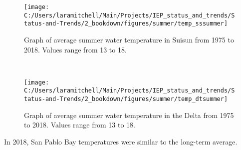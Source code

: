 \documentclass[
]{book}
\begin{document}
\begin{panel-grid}
\begin{columns-nocenter}
\begin{column40}
\end{column40}

\begin{column800}

\begin{expand}

\begin{figure}
\texttt{[image: C:/Users/laramitchell/Main/Projects/IEP\_status\_and\_trends/Status-and-Trends/2\_bookdown/figures/summer/temp\_sssummer]} \caption{Graph of average summer water temperature in Suisun from 1975 to 2018. Values range from 13 to 18.}\label{fig:unnamed-chunk-58}
\end{figure}

\end{expand}

\end{column800}

\begin{column40}

~

\end{column40}

\begin{column800}

\begin{expand}

\begin{figure}
\texttt{[image: C:/Users/laramitchell/Main/Projects/IEP\_status\_and\_trends/Status-and-Trends/2\_bookdown/figures/summer/temp\_dtsummer]} \caption{Graph of average summer water temperature in the Delta from 1975 to 2018. Values range from 13 to 18.}\label{fig:unnamed-chunk-59}
\end{figure}

\end{expand}

\end{column800}

\end{columns-nocenter}

\begin{columns-nocenter}

\begin{column800}

In 2018, San Pablo Bay temperatures were similar to the long-term average.

\end{column800}

\begin{column40}

~


\end{column40}
\end{columns-nocenter}
\end{panel-grid}
\end{document}
